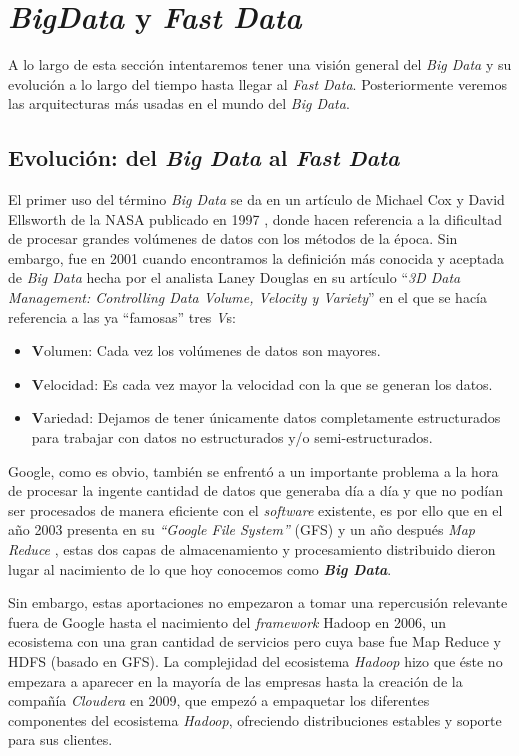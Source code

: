 \section{\textit{BigData} y \textit{Fast Data}}
\label{section:arte:big}
A lo largo de esta sección intentaremos tener una visión general del \textit{Big Data} y su evolución a lo largo del tiempo hasta llegar al \textit{Fast Data}. Posteriormente veremos las arquitecturas más usadas en el mundo del \textit{Big Data}. 

\subsection{Evolución: del \textit{Big Data} al \textit{Fast Data}}

El primer uso del término  \textit{Big Data}  se da en un artículo de Michael Cox y David Ellsworth de la NASA publicado en 1997 \cite{Cox_1997}, donde hacen referencia a la dificultad de procesar grandes volúmenes de datos con los métodos de la época. Sin embargo, fue en 2001 cuando encontramos la definición más conocida y aceptada de \textit{Big Data} hecha por el analista Laney Douglas en su artículo ``\textit{3D Data Management: Controlling Data Volume, Velocity y Variety}'' \cite{laneay_2013} en el que se hacía referencia a las ya ``famosas'' tres \textit{V}s:

\begin{itemize}
	\item \textbf{V}olumen:  Cada vez los volúmenes de datos son mayores.
	\item \textbf{V}elocidad: Es cada vez mayor la velocidad con la que se generan los datos.  
	\item \textbf{V}ariedad: Dejamos de tener únicamente datos completamente estructurados para trabajar con datos no estructurados y/o  semi-estructurados. 
\end{itemize} 


Google, como es obvio, también  se enfrentó a un importante problema a la hora de procesar la ingente cantidad de datos que generaba día a día y que no podían ser procesados de manera eficiente con el \textit{software} existente, es por ello que en el año 2003 presenta en \cite{GFS} su  \textit{``Google File System''} (GFS) y un año después \textit{Map Reduce} \cite{MapReduce}, estas dos capas de almacenamiento y procesamiento distribuido dieron lugar al nacimiento de lo que hoy conocemos como \textit{\textbf{Big Data}}.

Sin embargo, estas aportaciones no empezaron a tomar una repercusión relevante fuera de Google hasta el nacimiento del \textit{framework} Hadoop en 2006, un ecosistema con una gran cantidad de servicios pero cuya base fue Map Reduce y HDFS (basado en GFS). La complejidad del ecosistema \textit{Hadoop} hizo que éste no empezara a aparecer en la mayoría de las empresas hasta la creación de la compañía \textit{Cloudera} en 2009, que empezó a empaquetar los diferentes componentes del ecosistema \textit{Hadoop}, ofreciendo distribuciones estables y soporte para sus clientes. 


